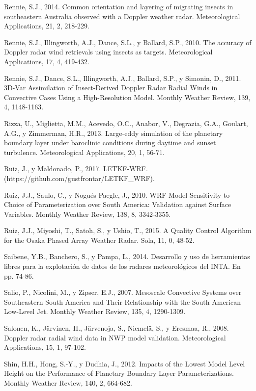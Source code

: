 \documentclass[12pt,spanish,oneside, a4paper]{book}
\begin{document}
\hypertarget{ref-Rennie2014}{}
Rennie, S.J., 2014. Common orientation and layering of migrating insects
in southeastern Australia observed with a Doppler weather radar.
Meteorological Applications, 21, 2, 218-229.

\hypertarget{ref-Rennie2010}{}
Rennie, S.J., Illingworth, A.J., Dance, S.L., y Ballard, S.P., 2010. The
accuracy of Doppler radar wind retrievals using insects as targets.
Meteorological Applications, 17, 4, 419-432.

\hypertarget{ref-Rennie2011}{}
Rennie, S.J., Dance, S.L., Illingworth, A.J., Ballard, S.P., y Simonin,
D., 2011. 3D-Var Assimilation of Insect-Derived Doppler Radar Radial
Winds in Convective Cases Using a High-Resolution Model. Monthly Weather
Review, 139, 4, 1148-1163.

\hypertarget{ref-Rizza2013}{}
Rizza, U., Miglietta, M.M., Acevedo, O.C., Anabor, V., Degrazia, G.A.,
Goulart, A.G., y Zimmerman, H.R., 2013. Large-eddy simulation of the
planetary boundary layer under baroclinic conditions during daytime and
sunset turbulence. Meteorological Applications, 20, 1, 56-71.

\hypertarget{ref-Ruiz2017}{}
Ruiz, J., y Maldonado, P., 2017. LETKF-WRF.
(https://github.com/gustfrontar/LETKF\_WRF).

\hypertarget{ref-Ruiz2010}{}
Ruiz, J.J., Saulo, C., y Nogués-Paegle, J., 2010. WRF Model Sensitivity
to Choice of Parameterization over South America: Validation against
Surface Variables. Monthly Weather Review, 138, 8, 3342-3355.

\hypertarget{ref-Ruiz2015}{}
Ruiz, J.J., Miyoshi, T., Satoh, S., y Ushio, T., 2015. A Quality Control
Algorithm for the Osaka Phased Array Weather Radar. Sola, 11, 0, 48-52.

\hypertarget{ref-Saibene2014}{}
Saibene, Y.B., Banchero, S., y Pampa, L., 2014. Desarrollo y uso de
herramientas libres para la explotación de datos de los radares
meteorológicos del INTA. En pp. 74-86.

\hypertarget{ref-Salio2007}{}
Salio, P., Nicolini, M., y Zipser, E.J., 2007. Mesoscale Convective
Systems over Southeastern South America and Their Relationship with the
South American Low-Level Jet. Monthly Weather Review, 135, 4, 1290-1309.

\hypertarget{ref-Salonen2008}{}
Salonen, K., Järvinen, H., Järvenoja, S., Niemelä, S., y Eresmaa, R.,
2008. Doppler radar radial wind data in NWP model validation.
Meteorological Applications, 15, 1, 97-102.

\hypertarget{ref-Shin2012}{}
Shin, H.H., Hong, S.-Y., y Dudhia, J., 2012. Impacts of the Lowest Model
Level Height on the Performance of Planetary Boundary Layer
Parameterizations. Monthly Weather Review, 140, 2, 664-682.
\end{document}
